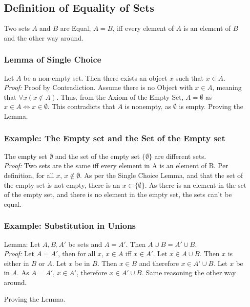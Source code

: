 \documentclass[]{scrbook}
\begin{document}
\subsection{Definition of Equality of Sets}

Two sets $A$ and $B$ are Equal, $A=B$, iff every element of $A$ is an element of $B$ and the other way around.

\subsubsection{Lemma of Single Choice}
Let $A$ be a non-empty set. Then there exists an object $x$ such that $x\in A$.\\
\textit{Proof:} Proof by Contradiction. Assume there is no Object with $x\in A$, meaning that $\forall x(x\notin A)$. Thus, from the Axiom of the Empty Set, $A = \emptyset$ as $x\in A \Leftrightarrow x\in\emptyset$. This contradicts that $A$ is nonempty, as $\emptyset$ is empty. Proving the Lemma.

\subsubsection{Example: The Empty set and the Set of the Empty set}
The empty set $\emptyset$ and the set of the empty set $\{\emptyset\}$ are different sets.\\
\textit{Proof:} Two sets are the same iff every element in A is an element of B. Per definition, for all $x$, $x\notin \emptyset$. As per the Single Choice Lemma, and that the set of the empty set is not empty, there is an $x \in \{\emptyset\}$. As there is an element in the set of the empty set, and there is no element in the empty set, the sets can't be equal.

\subsubsection{Example: Substitution in Unions}
Lemma: Let $A, B, A'$ be sets and $A = A'$. Then $A\cup B = A'\cup B$.\\
\textit{Proof:} Let $A = A'$, then for all $x$, $x\in A$ iff $x\in A'$. Let $x\in A\cup B$. Then $x$ is either in $B$ or $A$. Let $x$ be in $B$. Then $x\in B$ and therefore $x\in A'\cup B$. Let $x$ be in $A$. As $A = A'$, $x\in A'$, therefore $x\in A'\cup B$. Same reasoning the other way around.

Proving the Lemma.
\end{document}

